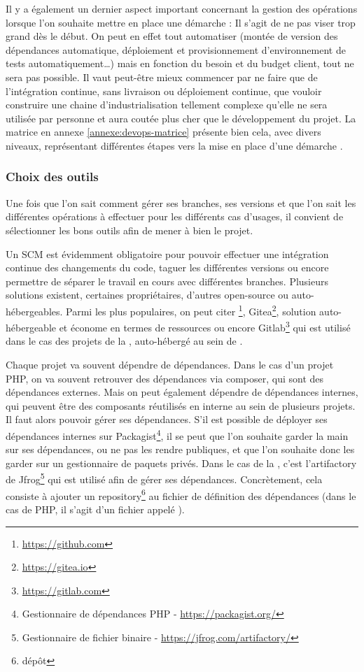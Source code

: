 Il y a également un dernier aspect important concernant la gestion des opérations lorsque l'on souhaite mettre en place une démarche \devops : Il s'agit de ne pas viser trop grand dès le début. On peut en effet tout automatiser (montée de version des dépendances automatique, déploiement et provisionnement d'environnement de tests automatiquement\ldots) mais en fonction du besoin et du budget client, tout ne sera pas possible. Il vaut peut-être mieux commencer par ne faire que de l'intégration continue, sans livraison ou déploiement continue, que vouloir construire une chaine d'industrialisation tellement complexe qu'elle ne sera utilisée par personne et aura coutée plus cher que le développement du projet. La matrice en annexe \ref{annexe:devops-matrice} présente bien cela, avec divers niveaux, représentant différentes étapes vers la mise en place d'une démarche \devops.

\subsubsection{Choix des outils}

Une fois que l'on sait comment gérer ses branches, ses versions et que l'on sait les différentes opérations à effectuer pour les différents cas d'usages, il convient de sélectionner les bons outils afin de mener à bien le projet.

Un \gls{SCM} est évidemment obligatoire pour pouvoir effectuer une intégration continue des changements du code, taguer les différentes versions ou encore permettre de séparer le travail en cours avec différentes branches. Plusieurs solutions existent, certaines propriétaires, d'autres open-source ou auto-hébergeables. Parmi les plus populaires, on peut citer \github\footnote{\url{https://github.com}}, Gitea\footnote{\url{https://gitea.io}}, solution auto-hébergeable et économe en termes de ressources ou encore Gitlab\footnote{\url{https://gitlab.com}} qui est utilisé dans le cas des projets de la \naq, auto-hébergé au sein de \onepoint.

Chaque projet va souvent dépendre de dépendances. Dans le cas d'un projet \gls{PHP}, on va souvent retrouver des dépendances via composer, qui sont des dépendances externes. Mais on peut également dépendre de dépendances internes, qui peuvent être des composants réutilisés en interne au sein de plusieurs projets. Il faut alors pouvoir gérer ses dépendances. S'il est possible de déployer ses dépendances internes sur Packagist\footnote{Gestionnaire de dépendances \gls{PHP} - \url{https://packagist.org/}}, il se peut que l'on souhaite garder la main sur ses dépendances, ou ne pas les rendre publiques, et que l'on souhaite donc les garder sur un gestionnaire de paquets privés. Dans le cas de la \naq, c'est l'\gls{artifactory} de Jfrog\footnote{Gestionnaire de fichier binaire - \url{https://jfrog.com/artifactory/}} qui est utilisé afin de gérer ses dépendances. Concrètement, cela consiste à ajouter un repository\footnote{dépôt} au fichier de définition des dépendances (dans le cas de \gls{PHP}, il s'agit d'un fichier appelé ).

